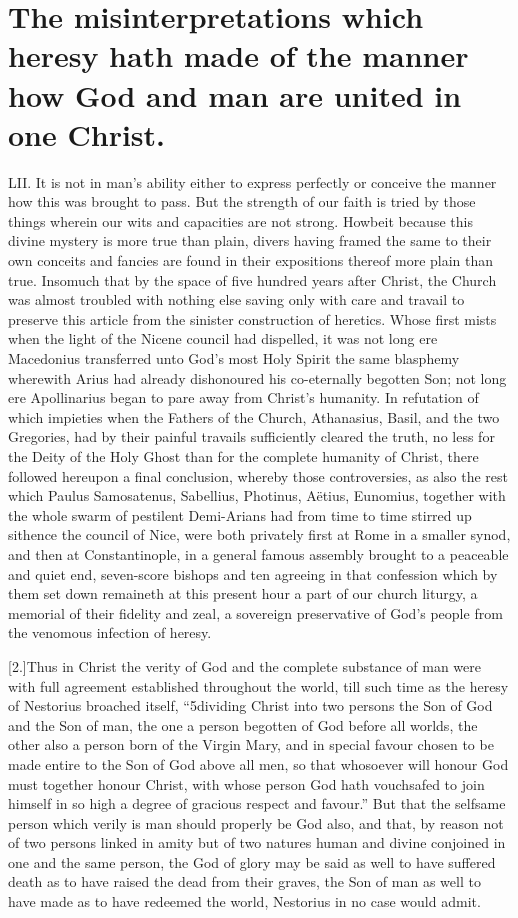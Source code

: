 \section*{The misinterpretations which heresy hath made of the manner how God and man are united in one Christ.}
LII. It is not in man’s ability either to express perfectly or conceive the manner how this was brought to pass. But the strength of our faith is tried by those things wherein our wits and capacities are not strong. Howbeit because this divine mystery is more true than plain, divers having framed the same to their own conceits and fancies are found in their expositions thereof more plain than true. Insomuch that by the space of five hundred years after Christ, the Church was almost  troubled with nothing else saving only with care and travail to preserve this article from the sinister construction of heretics.
 Whose first mists when the light of the Nicene council had dispelled, it was not long ere Macedonius transferred unto God’s most Holy Spirit the same blasphemy wherewith Arius had already dishonoured his co-eternally begotten Son; not long ere Apollinarius began to pare away from Christ’s humanity. In refutation of which impieties when the Fathers of the Church, Athanasius, Basil, and the two Gregories, had by their painful travails sufficiently cleared the truth, no less for the Deity of the Holy Ghost than for the complete humanity of Christ, there followed hereupon a final conclusion, whereby those controversies, as also the rest which Paulus Samosatenus, Sabellius, Photinus, Aëtius, Eunomius, together with the whole swarm of pestilent Demi-Arians had from time to time stirred up sithence the council of Nice, were both privately first at Rome in a smaller synod, and then at Constantinople, in a general famous assembly brought to a peaceable and quiet end, seven-score bishops and ten agreeing in that confession which by them set down remaineth at this present hour a part of our church liturgy, a memorial of their fidelity and zeal, a sovereign preservative of God’s people from the venomous infection of heresy.

[2.]Thus in Christ the verity of God and the complete substance of man were with full agreement established throughout the world, till such time as the heresy of Nestorius broached itself, “5dividing Christ into two persons the Son of God and  the Son of man,
 the one a person begotten of God before all worlds, the other also a person born of the Virgin Mary, and in special favour chosen to be made entire to the Son of God above all men, so that whosoever will honour God must together honour Christ, with whose person God hath vouchsafed to join himself in so high a degree of gracious respect and favour.” But that the selfsame person which verily is man should properly be God also, and that, by reason not of two persons linked in amity but of two natures human and divine conjoined in one and the same person, the God of glory may be said as well to have suffered death as to have raised the dead from their graves, the Son of man as well to have made as to have redeemed the world, Nestorius in no case would admit.

